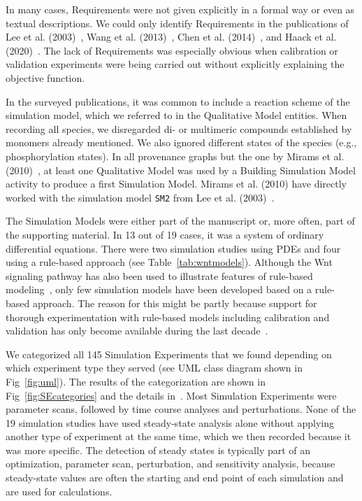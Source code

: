 \documentclass[10pt,letterpaper]{article}
\newcommand{\wnt}{Wnt}
\newcommand{\lee}{Lee et al. (2003)}
\newcommand{\Rs}{Requirements}
\newcommand{\QM}{Qualitative Model}
\newcommand{\SM}{Simulation Model}
\newcommand{\SMs}{Simulation Models}
\newcommand{\SEs}{Simulation Experiments}
\newcommand{\BSM}{Building Simulation Model}
\begin{document}
In many cases, \Rs{} were not given explicitly in a formal way or even as textual descriptions.
We could only identify \Rs{} in the publications of \lee{}~\cite{Lee2003}, Wang et al. (2013)~\cite{Wang2013}, Chen et al. (2014)~\cite{Chen2014}, and Haack et al. (2020)~\cite{Haack2020}.
The lack of \Rs{} was especially obvious when calibration or validation experiments were being carried out without explicitly explaining the objective function.

In the surveyed publications, it was common to include a reaction scheme of the simulation model, which we referred to in the \QM{} entities.
When recording all species, we disregarded di- or multimeric compounds established by monomers already mentioned.
We also ignored different states of the species (e.g., phosphorylation states).
In all provenance graphs but the one by Mirams et al. (2010)~\cite{Mirams2010}, at least one \QM{} was used by a \BSM{} activity to produce a first \SM{}.
Mirams et al. (2010) have directly worked with the simulation model \texttt{SM2} from \lee{}~\cite{Lee2003}.

The \SMs{} were either part of the manuscript or, more often, part of the supporting material.
In 13 out of 19 cases, it was a system of ordinary differential equations.
There were two simulation studies using PDEs and four using a rule-based approach (see Table~\ref{tab:wntmodels}).
Although the \wnt{} signaling pathway has also been used to illustrate features of rule-based modeling~\cite{Boutillier2018, Gross2019}, only few simulation models have been developed based on a rule-based approach.
The reason for this might be partly because support for thorough experimentation with rule-based models including calibration and validation has only become available during the last decade~\cite{Warnke2017, Thomas2015, Sorokin2019}.

We categorized all 145 \SEs{} that we found depending on which experiment type they served (see UML class diagram shown in Fig~\ref{fig:uml}).
The results of the categorization are shown in Fig~\ref{fig:SEcategories} and the details in~.
Most \SEs{} were parameter scans, followed by time course analyses and perturbations.
None of the 19 simulation studies have used steady-state analysis alone without applying another type of experiment at the same time, which we then recorded because it was more specific.
The detection of steady states is typically part of an optimization, parameter scan, perturbation, and sensitivity analysis, because steady-state values are often the starting and end point of each simulation and are used for calculations.
\end{document}

